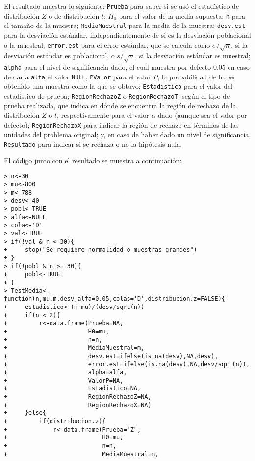 \begin{solucion}
 \par 
 El resultado muestra lo siguiente: \texttt{Prueba} para saber si se us\'o el estad\'{\i}stico de distribuci\'on $Z$ o de distribuci\'on $t$; $H_0$ para el valor de la media supuesta; \texttt{n} para el tama\~no de la muestra; \texttt{MediaMuestral} para la media de la muestra; \texttt{desv.est} para la desviaci\'on est\'andar, independientemente de si es la desviaci\'on poblacional o la muestral; \texttt{error.est} para el error est\'andar, que se calcula como $\sigma/\sqrt{n}$, si la desviaci\'on est\'andar es poblacional, o $s/\sqrt{n}$, si la desviaci\'on est\'andar es muestral; \texttt{alpha} para el nivel de significancia dado, el cual muestra por defecto $0.05$ en caso de dar a \texttt{alfa} el valor \texttt{NULL}; \texttt{PValor} para el valor $P$, la probabilidad de haber obtenido una muestra como la que se obtuvo; \texttt{Estadistico} para el valor del estad\'{\i}stico de prueba; \texttt{RegionRechazoZ} o \texttt{RegionRechazoT}, seg\'un el tipo de prueba realizada, que indica en d\'onde se encuentra la regi\'on de rechazo de la distribuci\'on $Z$ o $t$, respectivamente para el valor $\alpha$ dado (aunque sea el valor por defecto); \texttt{RegionRechazoX} para indicar la regi\'on de rechazo en t\'erminos de las unidades del problema original; y, en caso de haber dado un nivel de significancia, \texttt{Resultado} para indicar si se rechaza o no la hip\'otesis nula.
 \par 
 El c\'odigo junto con el resultado se muestra a continuaci\'on:
 \begin{verbatim}
> n<-30
> mu<-800
> m<-788
> desv<-40
> pobl<-TRUE
> alfa<-NULL
> cola<-'D'
> val<-TRUE
> if(!val & n < 30){
+     stop("Se requiere normalidad o muestras grandes")
+ }
> if(!pobl & n >= 30){
+     pobl<-TRUE
+ }
> TestMedia<-function(n,mu,m,desv,alfa=0.05,colas='D',distribucion.z=FALSE){
+     estadistico<-(m-mu)/(desv/sqrt(n))
+     if(n < 2){
+         r<-data.frame(Prueba=NA,
+                       H0=mu,
+                       n=n,
+                       MediaMuestral=m,
+                       desv.est=ifelse(is.na(desv),NA,desv),
+                       error.est=ifelse(is.na(desv),NA,desv/sqrt(n)),
+                       alpha=alfa,
+                       ValorP=NA,
+                       Estadistico=NA,
+                       RegionRechazoZ=NA,
+                       RegionRechazoX=NA)
+     }else{
+         if(distribucion.z){
+             r<-data.frame(Prueba="Z",
+                           H0=mu,
+                           n=n,
+                           MediaMuestral=m,

\end{verbatim}
\end{solucion}
